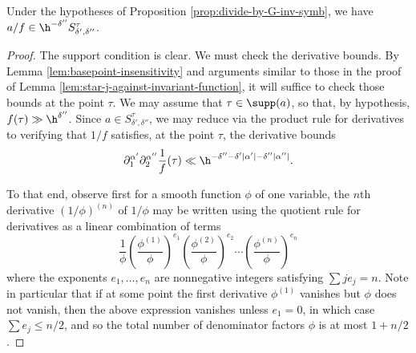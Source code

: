 \begin{lemma}\label{lem:b0-in-h-neg-delta-dubprime}
  Under the hypotheses of Proposition \ref{prop:divide-by-G-inv-symb}, we have $a/f \in \h^{- \delta ''} S_{\delta', \delta ''}^{\tau}$.
\end{lemma}
\begin{proof}
  The support condition is clear.  We must check the derivative bounds.  By Lemma \ref{lem:basepoint-insensitivity} and arguments similar to those in the proof of Lemma \ref{lem:star-j-against-invariant-function}, it will suffice to check those bounds at the point $\tau$.  We may assume that $\tau \in \supp(a)$, so that, by hypothesis, $f(\tau) \gg \h^{\delta ''}$.  Since $a \in S^\tau_{\delta ', \delta ''}$, we may reduce via the product rule for derivatives to verifying that $1/f$ satisfies, at the point $\tau$, the derivative bounds
  \begin{equation}\label{eqn:required-partials-for-1-over-f}
    \partial_{1}^{\alpha '}
    \partial_{2}^{\alpha ''} \frac{1}{f}(\tau) \ll
    \h^{- \delta '' - \delta ' |\alpha'| - \delta '' |\alpha ''|}.
  \end{equation}

  To that end, observe first for a smooth function $\phi$ of one variable, the $n$th derivative $(1/\phi)^{(n)}$ of $1/\phi$ may be written using the quotient rule for derivatives as a linear combination of terms
  \[
    \frac{1}{\phi } \left( \frac{\phi^{(1)} }{\phi } \right)^{e_1} \left( \frac{\phi^{(2)} }{\phi } \right)^{e_2} \dotsb \left( \frac{\phi^{(n)} }{\phi } \right)^{e_n}
  \]
  where the exponents $e_1,\dotsc,e_n$ are nonnegative integers satisfying $\sum j e_j = n$.  Note in particular that if at some point the first derivative $\phi^{(1)}$ vanishes but $\phi$ does not vanish, then the above expression vanishes unless $e_1 = 0$, in which case $\sum e_j \leq n/2$, and so the total number of denominator factors $\phi$ is at most $1 + n/2$ .


\end{proof}
